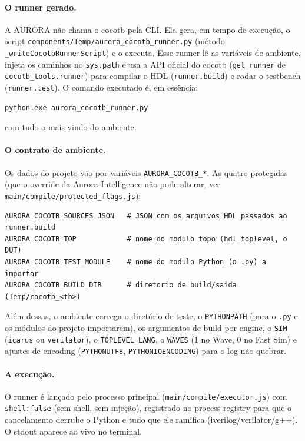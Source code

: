 \documentclass[11pt,a4paper]{article}
\begin{document}
\paragraph{O runner gerado.} A AURORA não chama o cocotb pela CLI. Ela gera, em
tempo de execução, o script \texttt{components/Temp/aurora\_cocotb\_runner.py}
(método \texttt{\_writeCocotbRunnerScript}) e o executa. Esse runner lê as
variáveis de ambiente, injeta os caminhos no \texttt{sys.path} e usa a API
oficial do cocotb (\texttt{get\_runner} de \texttt{cocotb\_tools.runner}) para
compilar o HDL (\texttt{runner.build}) e rodar o testbench (\texttt{runner.test}).
O comando executado é, em essência:

\begin{lstlisting}[language=bash]
python.exe aurora_cocotb_runner.py
\end{lstlisting}

com tudo o mais vindo do ambiente.

\paragraph{O contrato de ambiente.} Os dados do projeto vão por variáveis
\texttt{AURORA\_COCOTB\_*}. As quatro protegidas (que o override da Aurora
Intelligence não pode alterar, ver \texttt{main/compile/protected\_flags.js}):

\begin{lstlisting}
AURORA_COCOTB_SOURCES_JSON   # JSON com os arquivos HDL passados ao runner.build
AURORA_COCOTB_TOP            # nome do modulo topo (hdl_toplevel, o DUT)
AURORA_COCOTB_TEST_MODULE    # nome do modulo Python (o .py) a importar
AURORA_COCOTB_BUILD_DIR      # diretorio de build/saida (Temp/cocotb_<tb>)
\end{lstlisting}

Além dessas, o ambiente carrega o diretório de teste, o \texttt{PYTHONPATH} (para
o \texttt{.py} e os módulos do projeto importarem), os argumentos de build por
engine, o \texttt{SIM} (\texttt{icarus} ou \texttt{verilator}), o
\texttt{TOPLEVEL\_LANG}, o \texttt{WAVES} (1 no Wave, 0 no Fast Sim) e ajustes de
encoding (\texttt{PYTHONUTF8}, \texttt{PYTHONIOENCODING}) para o log não quebrar.

\paragraph{A execução.} O runner é lançado pelo processo principal
(\texttt{main/compile/executor.js}) com \texttt{shell:false} (sem shell, sem
injeção), registrado no process registry para que o cancelamento derrube o Python
e tudo que ele ramifica (iverilog/verilator/g++). O stdout aparece ao vivo no
terminal.
\end{document}
